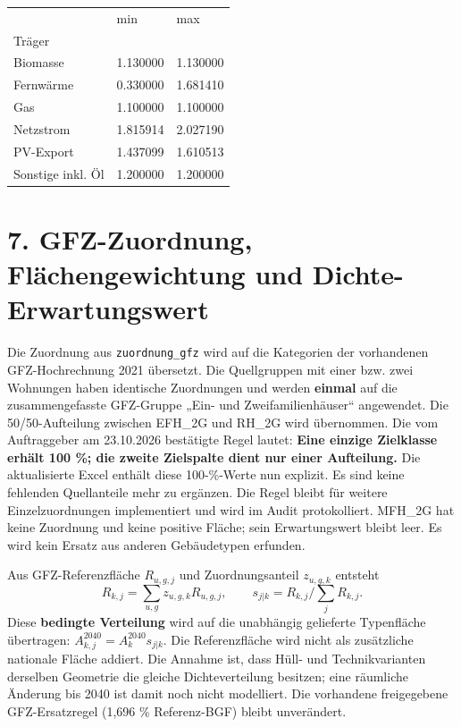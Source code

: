 \documentclass[
  ngerman,
  a4paper,
  DIV=11]{scrreprt}
\newcounter{none} %
\begin{document}
{\def\LTcaptype{none} %
\begin{longtable}[]{@{}lll@{}}
\toprule\noalign{}
& min & max \\
Träger & & \\
\midrule\noalign{}
\endhead
\bottomrule\noalign{}
\endlastfoot
Biomasse & 1.130000 & 1.130000 \\
Fernwärme & 0.330000 & 1.681410 \\
Gas & 1.100000 & 1.100000 \\
Netzstrom & 1.815914 & 2.027190 \\
PV-Export & 1.437099 & 1.610513 \\
Sonstige inkl. Öl & 1.200000 & 1.200000 \\
\end{longtable}
}

\section{7. GFZ-Zuordnung, Flächengewichtung und
Dichte-Erwartungswert}\label{sec-gebaeude-gfz}

Die Zuordnung aus \texttt{zuordnung\_gfz} wird auf die Kategorien der
vorhandenen GFZ-Hochrechnung 2021 übersetzt. Die Quellgruppen mit einer
bzw. zwei Wohnungen haben identische Zuordnungen und werden
\textbf{einmal} auf die zusammengefasste GFZ-Gruppe „Ein- und
Zweifamilienhäuser`` angewendet. Die 50/50-Aufteilung zwischen EFH\_2G
und RH\_2G wird übernommen. Die vom Auftraggeber am 23.10.2026
bestätigte Regel lautet: \textbf{Eine einzige Zielklasse erhält 100 \%;
die zweite Zielspalte dient nur einer Aufteilung.} Die aktualisierte
Excel enthält diese 100-\%-Werte nun explizit. Es sind keine fehlenden
Quellanteile mehr zu ergänzen. Die Regel bleibt für weitere
Einzelzuordnungen implementiert und wird im Audit protokolliert. MFH\_2G
hat keine Zuordnung und keine positive Fläche; sein Erwartungswert
bleibt leer. Es wird kein Ersatz aus anderen Gebäudetypen erfunden.

Aus GFZ-Referenzfläche \(R_{u,g,j}\) und Zuordnungsanteil \(z_{u,g,k}\)
entsteht
\[R_{k,j}=\sum_{u,g}z_{u,g,k}R_{u,g,j},\qquad s_{j|k}=R_{k,j}/\sum_j R_{k,j}.\]
Diese \textbf{bedingte Verteilung} wird auf die unabhängig gelieferte
Typenfläche übertragen: \(A_{k,j}^{2040}=A_k^{2040}s_{j|k}\). Die
Referenzfläche wird nicht als zusätzliche nationale Fläche addiert. Die
Annahme ist, dass Hüll- und Technikvarianten derselben Geometrie die
gleiche Dichteverteilung besitzen; eine räumliche Änderung bis 2040 ist
damit noch nicht modelliert. Die vorhandene freigegebene GFZ-Ersatzregel
(1,696 \% Referenz-BGF) bleibt unverändert.
\end{document}
